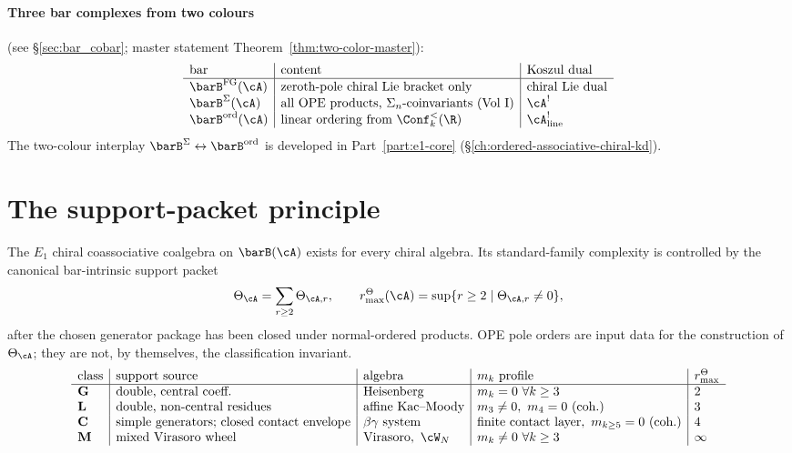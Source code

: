 \paragraph{Three bar complexes from two colours}
(see \S\ref{sec:bar_cobar}; master statement
Theorem~\ref{thm:two-color-master}):
\[
 \begin{array}{l|l|l}
 \text{bar} & \text{content} & \text{Koszul dual} \\
 \hline
 \barB^{\mathrm{FG}}(\cA) & \text{zeroth-pole chiral Lie bracket only} & \text{chiral Lie dual} \\
 \barB^{\Sigma}(\cA) & \text{all OPE products, $\Sigma_n$-coinvariants (Vol I)} & \cA^! \\
 \barB^{\mathrm{ord}}(\cA) & \text{linear ordering from $\Conf_k^<(\R)$} & \cA^!_{\mathrm{line}}
 \end{array}
\]
The two-colour interplay $\barB^{\Sigma} \leftrightarrow
\barB^{\mathrm{ord}}$ is developed in
Part~\ref{part:e1-core} (\S\ref{ch:ordered-associative-chiral-kd}).

\section*{The support-packet principle}
\label{sec:pole-order-principle}

The $E_1$ chiral coassociative coalgebra on $\barB(\cA)$ exists
for every chiral algebra. Its standard-family complexity is
controlled by the canonical bar-intrinsic support packet
\[
\Theta_\cA=\sum_{r\ge2}\Theta_{\cA,r},
\qquad
r^\Theta_{\max}(\cA)=\sup\{r\ge2\mid\Theta_{\cA,r}\ne0\},
\]
after the chosen generator package has been closed under
normal-ordered products. OPE pole orders are input data for the
construction of \(\Theta_\cA\); they are not, by themselves, the
classification invariant.
\[
 \begin{array}{l|l|l|l|l}
 \text{class} & \text{support source} & \text{algebra} & m_k \text{ profile} & r^\Theta_{\max} \\
 \hline
 \mathbf{G} & \text{double, central coeff.} & \text{Heisenberg} & m_k = 0\ \forall k \ge 3 & 2 \\
 \mathbf{L} & \text{double, non-central residues} & \text{affine Kac--Moody} & m_3 \ne 0,\ m_4 = 0\ \text{(coh.)} & 3 \\
 \mathbf{C} & \text{simple generators; closed contact envelope} & \beta\gamma\text{ system} & \text{finite contact layer},\ m_{k\ge 5} = 0\ \text{(coh.)} & 4 \\
 \mathbf{M} & \text{mixed Virasoro wheel} & \text{Virasoro},\ \cW_N & m_k \ne 0\ \forall k \ge 3 & \infty \\
 \end{array}
\]

